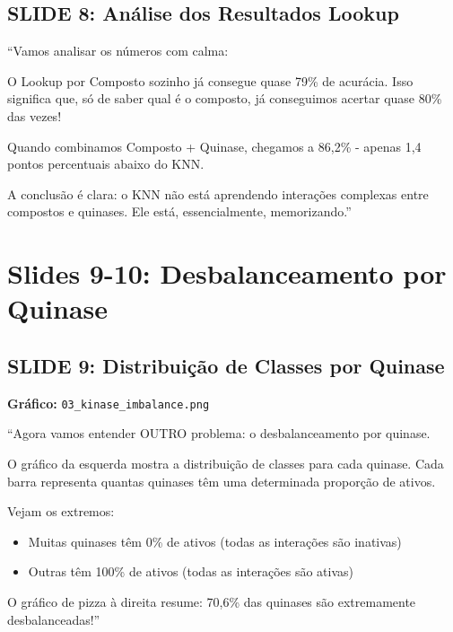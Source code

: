 \documentclass[11pt,a4paper]{article}
\begin{document}
\subsection{SLIDE 8: Análise dos Resultados Lookup}

\begin{oquedizer}
``Vamos analisar os números com calma:

O Lookup por Composto sozinho já consegue quase 79\% de acurácia. Isso significa que, só de saber qual é o composto, já conseguimos acertar quase 80\% das vezes!

Quando combinamos Composto + Quinase, chegamos a 86,2\% - apenas 1,4 pontos percentuais abaixo do KNN.

A conclusão é clara: o KNN não está aprendendo interações complexas entre compostos e quinases. Ele está, essencialmente, memorizando.''
\end{oquedizer}

\section{Slides 9-10: Desbalanceamento por Quinase}

\subsection{SLIDE 9: Distribuição de Classes por Quinase}

\textbf{Gráfico:} \texttt{03\_kinase\_imbalance.png}

\begin{oquedizer}
``Agora vamos entender OUTRO problema: o desbalanceamento por quinase.

O gráfico da esquerda mostra a distribuição de classes para cada quinase. Cada barra representa quantas quinases têm uma determinada proporção de ativos.

Vejam os extremos:
\begin{itemize}
    \item Muitas quinases têm 0\% de ativos (todas as interações são inativas)
    \item Outras têm 100\% de ativos (todas as interações são ativas)
\end{itemize}

O gráfico de pizza à direita resume: 70,6\% das quinases são extremamente desbalanceadas!''
\end{oquedizer}
\end{document}
